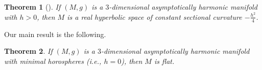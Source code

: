 \documentclass[12pt,a4paper]{amsart}
\newtheorem{Thm}{Theorem}[section]
\newtheorem{Pro}[Thm]{Proposition}
\theoremstyle{definition}
\theoremstyle{remark}
\newcommand \<{\langle}
\renewcommand \>{\rangle}
\begin{document}
 \begin{Thm}[\cite{S}]\label{thm:ross}
    If $(M,g)$ is a $3$-dimensional asymptotically harmonic manifold with $h>0$, then $M$ is a real hyperbolic space of constant sectional curvature $-\frac{h^2}{4}$.
\end{Thm}












Our main result is the following.
\begin{Thm}\label{thm:mainthm}
If $(M,g)$ is a $3$-dimensional asymptotically harmonic manifold with minimal horospheres {\rm(}i.e., $h=0${\rm)}, then $M$ is flat.
\end{Thm}


\end{document}

